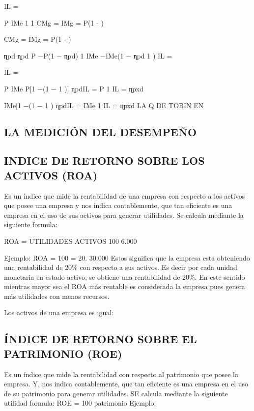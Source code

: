 \documentclass[
  letterpaper,
  DIV=11,
  numbers=noendperiod]{scrartcl}
\begin{document}
IL =

P IMe 1 1 CMg = IMg = P(1 - )

CMg = IMg = P(1 - )

ɳpd ɳpd P −P(1 − ɳpd) 1 IMe −IMe(1 − ɳpd 1 ) IL =

IL =

P IMe P{[}1 −(1 − 1 ){]} ɳpdIL = P 1 IL = ɳpxd

IMe{[}1 −(1 − 1 ) ɳpdIL = IMe 1 IL = ɳpxd LA Q DE TOBIN EN

\hypertarget{la-mediciuxf3n-del-desempeuxf1o}{%
\subsection{LA MEDICIÓN DEL
DESEMPEÑO}\label{la-mediciuxf3n-del-desempeuxf1o}}

\hypertarget{indice-de-retorno-sobre-los-activos-roa}{%
\subsection{INDICE DE RETORNO SOBRE LOS ACTIVOS
(ROA)}\label{indice-de-retorno-sobre-los-activos-roa}}

Es un índice que mide la rentabilidad de una empresa con respecto a los
activos que posee una empresa y nos indica contablemente, que tan
eficiente es una empresa en el uso de sus activos para generar
utilidades. Se calcula mediante la siguiente formula:

ROA = UTILIDADES ACTIVOS 100 6.000

Ejemplo: ROA = 100 = 20. 30.000 Estos significa que la empresa esta
obteniendo una rentabilidad de 20\% con respecto a sus activos. Es decir
por cada unidad monetaria en estado activo, se obtiene una rentabilidad
de 20\%. En este sentido mientras mayor sea el ROA más rentable es
considerada la empresa pues genera más utilidades con menos recursos.

Los activos de una empresa es igual:

\hypertarget{uxedndice-de-retorno-sobre-el-patrimonio-roe}{%
\subsection{ÍNDICE DE RETORNO SOBRE EL PATRIMONIO
(ROE)}\label{uxedndice-de-retorno-sobre-el-patrimonio-roe}}

Es un índice que mide la rentabilidad con respecto al patrimonio que
posee la empresa. Y, nos indica contablemente, que tan eficiente es una
empresa en el uso de su patrimonio para generar utilidades. SE calcula
mediante la siguiente utilidad formula: ROE = 100 patrimonio Ejemplo:
\end{document}

